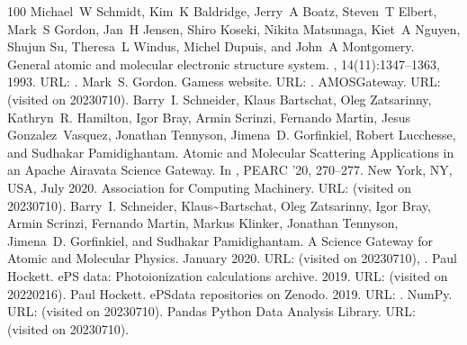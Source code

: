 \documentclass[letterpaper,table,10pt,english]{jupyterBook}
\begin{document}
\begin{sphinxthebibliography}{100}
\sphinxAtStartPar
Michael W Schmidt, Kim K Baldridge, Jerry A Boatz, Steven T Elbert, Mark S Gordon, Jan H Jensen, Shiro Koseki, Nikita Matsunaga, Kiet A Nguyen, Shujun Su, Theresa L Windus, Michel Dupuis, and John A Montgomery. General atomic and molecular electronic structure system. , 14(11):1347–1363, 1993. URL: .
\sphinxAtStartPar
Mark S. Gordon. Gamess website. URL: .
\sphinxAtStartPar
AMOSGateway. URL:  (visited on 2023\sphinxhyphen{}07\sphinxhyphen{}10).
\sphinxAtStartPar
Barry I. Schneider, Klaus Bartschat, Oleg Zatsarinny, Kathryn R. Hamilton, Igor Bray, Armin Scrinzi, Fernando Martin, Jesus Gonzalez Vasquez, Jonathan Tennyson, Jimena D. Gorfinkiel, Robert Lucchesse, and Sudhakar Pamidighantam. Atomic and Molecular Scattering Applications in an Apache Airavata Science Gateway. In , PEARC '20, 270–277. New York, NY, USA, July 2020. Association for Computing Machinery. URL:  (visited on 2023\sphinxhyphen{}07\sphinxhyphen{}10).
\sphinxAtStartPar
Barry I. Schneider, Klaus\textasciitilde{}Bartschat, Oleg Zatsarinny, Igor Bray, Armin Scrinzi, Fernando Martin, Markus Klinker, Jonathan Tennyson, Jimena D. Gorfinkiel, and Sudhakar Pamidighantam. A Science Gateway for Atomic and Molecular Physics. January 2020. URL:  (visited on 2023\sphinxhyphen{}07\sphinxhyphen{}10), .
\sphinxAtStartPar
Paul Hockett. ePS data: Photoionization calculations archive. 2019. URL:  (visited on 2022\sphinxhyphen{}02\sphinxhyphen{}16).
\sphinxAtStartPar
Paul Hockett. ePSdata repositories on Zenodo. 2019. URL: .
\sphinxAtStartPar
NumPy. URL:  (visited on 2023\sphinxhyphen{}07\sphinxhyphen{}10).
\sphinxAtStartPar
Pandas \sphinxhyphen{} Python Data Analysis Library. URL:  (visited on 2023\sphinxhyphen{}07\sphinxhyphen{}10).

\end{sphinxthebibliography}
\end{document}
